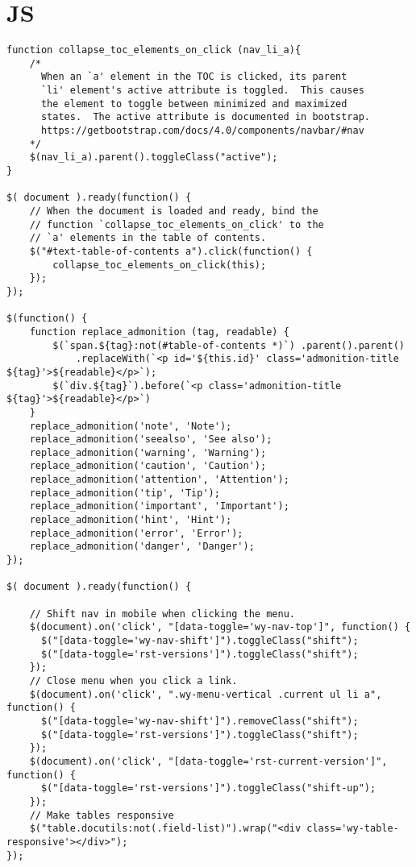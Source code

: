 \documentclass[11pt]{article}
\begin{document}
\section{JS}
\label{sec:org25377ea}
\begin{verbatim}
function collapse_toc_elements_on_click (nav_li_a){
    /*
      When an `a' element in the TOC is clicked, its parent
      `li' element's active attribute is toggled.  This causes
      the element to toggle between minimized and maximized
      states.  The active attribute is documented in bootstrap.
      https://getbootstrap.com/docs/4.0/components/navbar/#nav
    */
    $(nav_li_a).parent().toggleClass("active");
}

$( document ).ready(function() {
    // When the document is loaded and ready, bind the
    // function `collapse_toc_elements_on_click' to the
    // `a' elements in the table of contents.
    $("#text-table-of-contents a").click(function() {
        collapse_toc_elements_on_click(this);
    });
});

$(function() {
    function replace_admonition (tag, readable) {
        $(`span.${tag}:not(#table-of-contents *)`) .parent().parent()
            .replaceWith(`<p id='${this.id}' class='admonition-title ${tag}'>${readable}</p>`);
        $(`div.${tag}`).before(`<p class='admonition-title ${tag}'>${readable}</p>`)
    }
    replace_admonition('note', 'Note');
    replace_admonition('seealso', 'See also');
    replace_admonition('warning', 'Warning');
    replace_admonition('caution', 'Caution');
    replace_admonition('attention', 'Attention');
    replace_admonition('tip', 'Tip');
    replace_admonition('important', 'Important');
    replace_admonition('hint', 'Hint');
    replace_admonition('error', 'Error');
    replace_admonition('danger', 'Danger');
});

$( document ).ready(function() {

    // Shift nav in mobile when clicking the menu.
    $(document).on('click', "[data-toggle='wy-nav-top']", function() {
      $("[data-toggle='wy-nav-shift']").toggleClass("shift");
      $("[data-toggle='rst-versions']").toggleClass("shift");
    });
    // Close menu when you click a link.
    $(document).on('click', ".wy-menu-vertical .current ul li a", function() {
      $("[data-toggle='wy-nav-shift']").removeClass("shift");
      $("[data-toggle='rst-versions']").toggleClass("shift");
    });
    $(document).on('click', "[data-toggle='rst-current-version']", function() {
      $("[data-toggle='rst-versions']").toggleClass("shift-up");
    });
    // Make tables responsive
    $("table.docutils:not(.field-list)").wrap("<div class='wy-table-responsive'></div>");
});


\end{verbatim}
\end{document}
